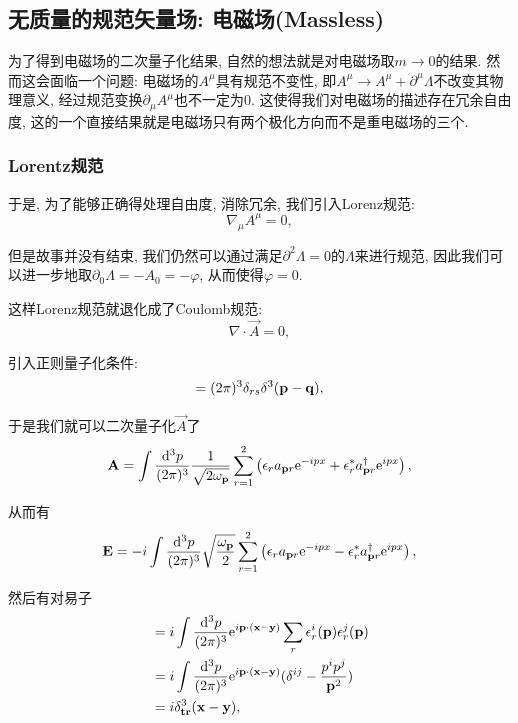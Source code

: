 \subsection{无质量的规范矢量场: 电磁场(Massless)}
为了得到电磁场的二次量子化结果, 自然的想法就是对电磁场取$m\rightarrow0$的结果. 然而这会面临一个问题: 电磁场的$A^\mu$具有规范不变性, 即$A^\mu\rightarrow A^\mu+\partial^\mu\Lambda$不改变其物理意义, 经过规范变换$\partial_\mu A^\mu$也不一定为0. 这使得我们对电磁场的描述存在冗余自由度, 这的一个直接结果就是电磁场只有两个极化方向而不是重电磁场的三个.

\subsubsection{Lorentz规范}
于是, 为了能够正确得处理自由度, 消除冗余, 我们引入Lorenz规范:
\begin{equation}
    \nabla_\mu A^\mu=0,
\end{equation}

但是故事并没有结束, 我们仍然可以通过满足$\partial^2\Lambda=0$的$\Lambda$来进行规范, 因此我们可以进一步地取$\partial_0\Lambda=-A_0=-\varphi$, 从而使得$\varphi=0$.

这样Lorenz规范就退化成了Coulomb规范:
\begin{equation}
    \nabla\cdot\vec A=0,
\end{equation}

引入正则量子化条件:
\begin{equation}
    [a_{\vec pr}, a^\dagger_{\vec qs}]=\dpi3\delta_{rs}\delta^3(\vec p-\vec q),
\end{equation}

于是我们就可以二次量子化$\vec A$了
\begin{equation}
    \vec A=\int\ldsq p\sum_{r=1}^2\left(\vec\epsilon_ra_{\vec pr}\exp{-ipx}+\vec\epsilon_r^*a_{\vec pr}^\dagger\exp{ipx}\right),
\end{equation}

从而有
\begin{equation}
    \mathbf{E}=-i\int\frac{\mathrm d^3p}{(2\pi)^3}\sqrt{\frac{\omega_{\mathbf{p}}}2}\sum_{r=1}^2\left(\mathbf{\epsilon}_ra_{\mathbf{p}r}\mathrm e^{-ipx}-\mathbf{\epsilon}_r^*a_{\mathbf{p}r}^\dagger\mathrm e^{ipx}\right),
\end{equation}

然后有对易子
\begin{align}
    [A^i_{\vec x}, E^j_{\vec y}]&=i\int\ddd p\exp{i\vec p\cdot(\vec x-\vec y)}\sum_r\epsilon_r^i(\vec p)\epsilon^j_r(\vec p)\\
    &=i\int\ddd p\exp{i\vec p\cdot(\vec x-\vec y)}(\delta^{ij}-\frac{p^ip^j}{\vec p^2})\\
    &=i\delta^3_{\bf{tr}}(\vec x-\vec y),
\end{align}

